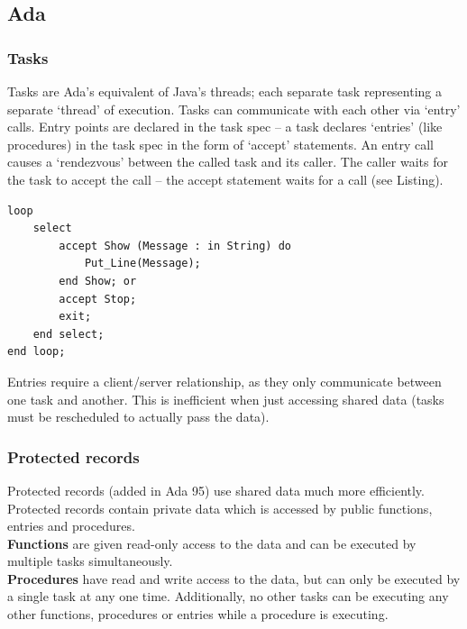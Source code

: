 \documentclass[a4paper,oneside]{report}
\begin{document}
    	\subsection{Ada}
    	
      		\subsubsection{Tasks}
      		Tasks are Ada's equivalent of Java's threads; each separate task representing a separate `thread' of execution. Tasks can communicate with each other via `entry' calls. Entry points are declared in the task spec
– a task declares ‘entries’ (like procedures) in the task spec in the form of ‘accept’ statements. An entry call causes a ‘rendezvous’ between the called task and its caller. The caller waits for the task to accept the call – the accept statement waits for a call (see Listing).
         
\begin{lstlisting}[label=some-code,caption=Ada's Accept Statement] 
loop 
	select
		accept Show (Message : in String) do
			Put_Line(Message);
		end Show; or
		accept Stop;
        exit;
	end select;
end loop;
\end{lstlisting}
      		
      		Entries require a client/server relationship, as they only communicate between one task and another. This is inefficient when just accessing shared data (tasks must be rescheduled to actually pass the data).
      		
      		\subsubsection{Protected records}
      		Protected records (added in Ada 95) use shared data much more efficiently. Protected records contain private data which is accessed by public functions, entries and procedures.\\
      		
      		\noindent\textbf{Functions} are given read-only access to the data and can be executed by multiple tasks simultaneously.\\
      		
      		\noindent\textbf{Procedures} have read and write access to the data, but can only be executed by a single task at any one time. Additionally, no other tasks can be executing any other functions, procedures or entries while a procedure is executing.\\
      		
\end{document}
